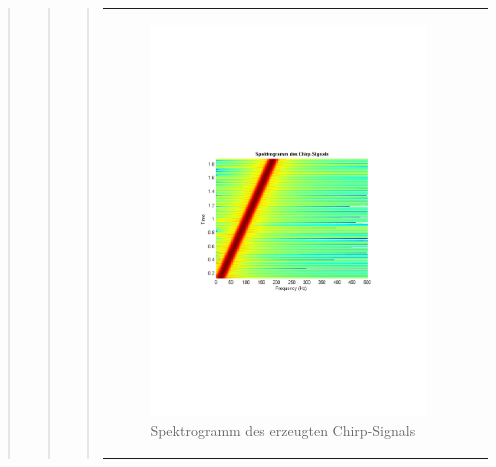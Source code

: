 \begin{quote}
\begin{quote}
\begin{quote}
\begin{center}
\begin{tabular}{ll}
\begin{minipage}{0.6\textwidth}
                        \begin{figure}[H]
                            \label{fig:}
                            \includegraphics[scale=0.63, trim = 3cm 9cm 3cm
                            9cm,
                            clip]{./Bilder/Termin7/bsp_chirp_spectrogram}
                            \caption{Spektrogramm des erzeugten Chirp-Signals}
                        \end{figure}
                    \vspace{-1.5em}
    
                    \end{minipage}
    
                \end{tabular}
                \end{center}
                

\end{quote}
\end{quote}
\end{quote}
